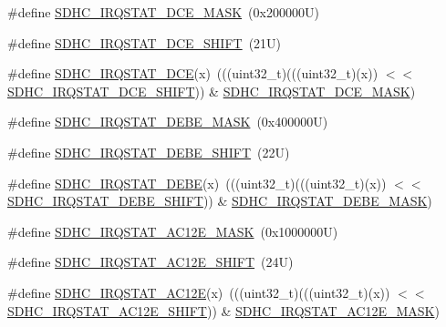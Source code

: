 \begin{DoxyCompactItemize}
\item 
\#define \mbox{\hyperlink{group___s_d_h_c___register___masks_ga48e68fbecd65304dfca83a00e76f03f2}{S\+D\+H\+C\+\_\+\+I\+R\+Q\+S\+T\+A\+T\+\_\+\+D\+C\+E\+\_\+\+M\+A\+SK}}~(0x200000\+U)
\item 
\#define \mbox{\hyperlink{group___s_d_h_c___register___masks_ga76f0e02634ba99e8b7dd3db03d6e9dc6}{S\+D\+H\+C\+\_\+\+I\+R\+Q\+S\+T\+A\+T\+\_\+\+D\+C\+E\+\_\+\+S\+H\+I\+FT}}~(21\+U)
\item 
\#define \mbox{\hyperlink{group___s_d_h_c___register___masks_ga8c806c63ee50538fa47fdc702929badc}{S\+D\+H\+C\+\_\+\+I\+R\+Q\+S\+T\+A\+T\+\_\+\+D\+CE}}(x)~(((uint32\+\_\+t)(((uint32\+\_\+t)(x)) $<$$<$ \mbox{\hyperlink{group___s_d_h_c___register___masks_ga76f0e02634ba99e8b7dd3db03d6e9dc6}{S\+D\+H\+C\+\_\+\+I\+R\+Q\+S\+T\+A\+T\+\_\+\+D\+C\+E\+\_\+\+S\+H\+I\+FT}})) \& \mbox{\hyperlink{group___s_d_h_c___register___masks_ga48e68fbecd65304dfca83a00e76f03f2}{S\+D\+H\+C\+\_\+\+I\+R\+Q\+S\+T\+A\+T\+\_\+\+D\+C\+E\+\_\+\+M\+A\+SK}})
\item 
\#define \mbox{\hyperlink{group___s_d_h_c___register___masks_gaff8f0d4c189f99dc324251e1c1486414}{S\+D\+H\+C\+\_\+\+I\+R\+Q\+S\+T\+A\+T\+\_\+\+D\+E\+B\+E\+\_\+\+M\+A\+SK}}~(0x400000\+U)
\item 
\#define \mbox{\hyperlink{group___s_d_h_c___register___masks_gaca30553c1983afb6604acc0468a3a7b9}{S\+D\+H\+C\+\_\+\+I\+R\+Q\+S\+T\+A\+T\+\_\+\+D\+E\+B\+E\+\_\+\+S\+H\+I\+FT}}~(22\+U)
\item 
\#define \mbox{\hyperlink{group___s_d_h_c___register___masks_ga37a05b75c175a47d783619fe634eb6c2}{S\+D\+H\+C\+\_\+\+I\+R\+Q\+S\+T\+A\+T\+\_\+\+D\+E\+BE}}(x)~(((uint32\+\_\+t)(((uint32\+\_\+t)(x)) $<$$<$ \mbox{\hyperlink{group___s_d_h_c___register___masks_gaca30553c1983afb6604acc0468a3a7b9}{S\+D\+H\+C\+\_\+\+I\+R\+Q\+S\+T\+A\+T\+\_\+\+D\+E\+B\+E\+\_\+\+S\+H\+I\+FT}})) \& \mbox{\hyperlink{group___s_d_h_c___register___masks_gaff8f0d4c189f99dc324251e1c1486414}{S\+D\+H\+C\+\_\+\+I\+R\+Q\+S\+T\+A\+T\+\_\+\+D\+E\+B\+E\+\_\+\+M\+A\+SK}})
\item 
\#define \mbox{\hyperlink{group___s_d_h_c___register___masks_gaa084b3a11c48abfe299e0f4dd5e6522c}{S\+D\+H\+C\+\_\+\+I\+R\+Q\+S\+T\+A\+T\+\_\+\+A\+C12\+E\+\_\+\+M\+A\+SK}}~(0x1000000\+U)
\item 
\#define \mbox{\hyperlink{group___s_d_h_c___register___masks_gaa438836d215d57b0c6284879f9460161}{S\+D\+H\+C\+\_\+\+I\+R\+Q\+S\+T\+A\+T\+\_\+\+A\+C12\+E\+\_\+\+S\+H\+I\+FT}}~(24\+U)
\item 
\#define \mbox{\hyperlink{group___s_d_h_c___register___masks_gab9215e461068bd3ce891b700f2936738}{S\+D\+H\+C\+\_\+\+I\+R\+Q\+S\+T\+A\+T\+\_\+\+A\+C12E}}(x)~(((uint32\+\_\+t)(((uint32\+\_\+t)(x)) $<$$<$ \mbox{\hyperlink{group___s_d_h_c___register___masks_gaa438836d215d57b0c6284879f9460161}{S\+D\+H\+C\+\_\+\+I\+R\+Q\+S\+T\+A\+T\+\_\+\+A\+C12\+E\+\_\+\+S\+H\+I\+FT}})) \& \mbox{\hyperlink{group___s_d_h_c___register___masks_gaa084b3a11c48abfe299e0f4dd5e6522c}{S\+D\+H\+C\+\_\+\+I\+R\+Q\+S\+T\+A\+T\+\_\+\+A\+C12\+E\+\_\+\+M\+A\+SK}})
$$
\end{DoxyCompactItemize}
